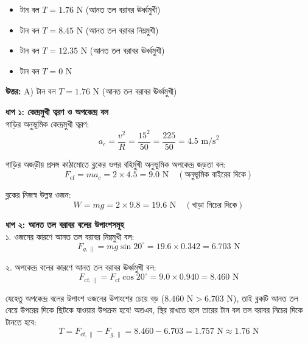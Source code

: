 \documentclass[12pt, a4paper]{article}
\begin{document}
\begin{itemize}[label={}, leftmargin=1cm, itemsep=0.5em]
    \item[\textbf{A)}] টান বল $T = 1.76\text{ N}$ (আনত তল বরাবর ঊর্ধ্বমুখী)
    \item[\textbf{B)}] টান বল $T = 8.45\text{ N}$ (আনত তল বরাবর নিম্নমুখী)
    \item[\textbf{C)}] টান বল $T = 12.35\text{ N}$ (আনত তল বরাবর ঊর্ধ্বমুখী)
    \item[\textbf{D)}] টান বল $T = 0\text{ N}$
\end{itemize}

\vspace{0.5em}
\begin{tcolorbox}[answerbox]
    \textbf{\color{success} উত্তর:} A) টান বল $T = 1.76\text{ N}$ (আনত তল বরাবর ঊর্ধ্বমুখী)
\end{tcolorbox}
\vspace{1em}

\begin{tcolorbox}[solutionbox={সমাধান (Solution)}]
    \noindent
    \textbf{ধাপ ১: কেন্দ্রমুখী ত্বরণ ও অপকেন্দ্র বল} \\
    গাড়ির অনুভূমিক কেন্দ্রমুখী ত্বরণ:
    \[ a_c = \frac{v^2}{R} = \frac{15^2}{50} = \frac{225}{50} = 4.5\text{ m/s}^2 \]
    
    গাড়ির অজড়ীয় প্রসঙ্গ কাঠামোতে ব্লকের ওপর বহির্মুখী অনুভূমিক অপকেন্দ্র জড়তা বল:
    \[ F_{\text{cf}} = m a_c = 2 \times 4.5 = 9.0\text{ N} \quad (\text{অনুভূমিক বাইরের দিকে}) \]
    
    ব্লকের নিজস্ব উল্লম্ব ওজন:
    \[ W = m g = 2 \times 9.8 = 19.6\text{ N} \quad (\text{খাড়া নিচের দিকে}) \]
    
    \vspace{0.5em}
    \noindent\textbf{ধাপ ২: আনত তল বরাবর বলের উপাংশসমূহ} \\
    ১. ওজনের কারণে আনত তল বরাবর নিম্নমুখী বল:
    \[ F_{g, \parallel} = m g \sin 20^\circ = 19.6 \times 0.342 = 6.703\text{ N} \]
    
    ২. অপকেন্দ্র বলের কারণে আনত তল বরাবর ঊর্ধ্বমুখী বল:
    \[ F_{\text{cf}, \parallel} = F_{\text{cf}} \cos 20^\circ = 9.0 \times 0.940 = 8.460\text{ N} \]
    
    যেহেতু অপকেন্দ্র বলের উপাংশ ওজনের উপাংশের চেয়ে বড় ($8.460\text{ N} > 6.703\text{ N}$), তাই ব্লকটি আনত তল বেয়ে উপরের দিকে ছিটকে যাওয়ার উপক্রম হবে! অতএব, স্থির রাখতে হলে তারের টান বল তল বরাবর নিচের দিকে টানতে হবে:
    \[ T = F_{\text{cf}, \parallel} - F_{g, \parallel} = 8.460 - 6.703 = 1.757\text{ N} \approx \mathbf{1.76}\text{ N} \]
\end{tcolorbox}
\end{document}
